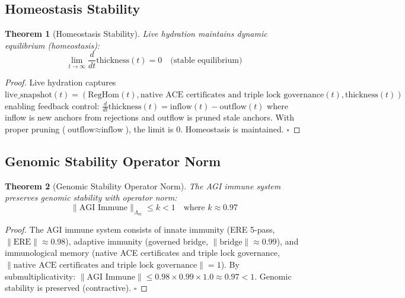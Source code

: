 \documentclass[11pt,a4paper]{article}
\newtheorem{theorem}{Theorem}[section]
\begin{document}
\subsection{Homeostasis Stability}

\begin{theorem}[Homeostasis Stability]\label{thm:homeostasis}
Live hydration maintains dynamic equilibrium (homeostasis):
\begin{equation}
\lim_{t \to \infty} \frac{d}{dt}\text{thickness}(t) = 0 \quad \text{(stable equilibrium)}
\end{equation}
\end{theorem}

\begin{proof}
Live hydration captures $\text{live\_snapshot}(t) = (\text{RegHom}(t), \text{native ACE certificates and triple lock governance}(t), \text{thickness}(t))$ enabling feedback control: $\frac{d}{dt}\text{thickness}(t) = \text{inflow}(t) - \text{outflow}(t)$ where inflow is new anchors from rejections and outflow is pruned stale anchors. With proper pruning ($\text{outflow} \approx \text{inflow}$), the limit is 0. Homeostasis is maintained. \hfill$\square$
\end{proof}

\subsection{Genomic Stability Operator Norm}

\begin{theorem}[Genomic Stability Operator Norm]\label{thm:genomic_norm}
The AGI immune system preserves genomic stability with operator norm:
\begin{equation}
\|\text{AGI Immune}\|_{\Lambda_m} \leq k < 1 \quad \text{where } k \approx 0.97
\end{equation}
\end{theorem}

\begin{proof}
The AGI immune system consists of innate immunity (ERE 5-pass, $\|\text{ERE}\| \approx 0.98$), adaptive immunity (governed bridge, $\|\text{bridge}\| \approx 0.99$), and immunological memory (native ACE certificates and triple lock governance, $\|\text{native ACE certificates and triple lock governance}\| = 1$). By submultiplicativity: $\|\text{AGI Immune}\| \leq 0.98 \times 0.99 \times 1.0 \approx 0.97 < 1$. Genomic stability is preserved (contractive). \hfill$\square$
\end{proof}
\end{document}
